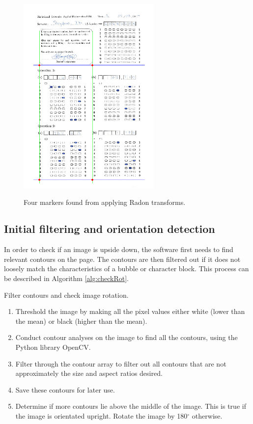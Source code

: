 \begin{figure}
  \centering
  \includegraphics[width=7cm]{RadonResults}\\
  \caption{Four markers found from applying Radon transforms.}
  \label{fig:radonResults}
\end{figure}

\subsection{Initial filtering and orientation detection}
\label{sec:InitImageFilter}

In order to check if an image is upside down, the software first needs to find relevant contours on the page. The contours are then filtered out if it does not loosely match the characteristics of a bubble or character block. This process can be described in Algorithm \ref{alg:checkRot}.

\begin{algorithm}[H]
\caption{Filter contours and check image rotation.}
\label{alg:checkRot}
\begin{enumerate}
\item Threshold the image by making all the pixel values either white (lower than the mean) or black (higher than the mean).
\item Conduct contour analyses on the image to find all the contours, using the Python library OpenCV.
\item Filter through the contour array to filter out all contours that are not approximately the size and aspect ratios desired.
\item Save these contours for later use.
\item Determine if more contours lie above the middle of the image. This is true if the image is orientated upright. Rotate the image by 180$^{\circ}$ otherwise.
\end{enumerate}
\end{algorithm}



